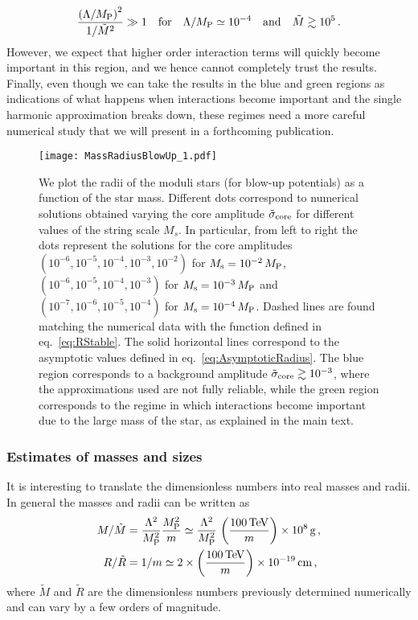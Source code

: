 \documentclass[11pt,a4paper]{article}
\begin{document}
\begin{equation}
\frac{\left(\Lambda/M_{\rm P}\right)^2}{1/\tilde{M}^2} \gg 1 \quad \text{for} \quad \Lambda/M_{\rm P} \simeq 10^{-4} \quad \text{and} \quad \tilde{M} \gtrsim 10^{5} \,.
\end{equation}
However, we expect that higher order interaction terms will quickly become important in this region, and we hence cannot completely trust the results. Finally, even though we can take the results in the blue and green regions as indications of what happens when interactions become important and the single harmonic approximation breaks down, these regimes need a more careful numerical study that we will present in a forthcoming publication.
\begin{figure}[h!]
\begin{center}
\texttt{[image: MassRadiusBlowUp\_1.pdf]}
\caption{We plot the radii of the moduli stars (for blow-up potentials) as a function of the star mass. Different dots correspond to numerical solutions obtained varying the core amplitude $\tilde{\sigma}_{\rm core}$ for different values of the string scale $M_s$. In particular, from left to right the dots represent the solutions for the core amplitudes $\left(10^{-6}, 10^{-5}, 10^{-4}, 10^{-3}, 10^{-2}\right)$ for $M_{\rm s} = 10^{-2} \, M_{\rm P}$, $\left(10^{-6}, 10^{-5}, 10^{-4}, 10^{-3}\right)$ for $M_{\rm s} = 10^{-3} \, M_{\rm P}$ and $\left(10^{-7}, 10^{-6}, 10^{-5}, 10^{-4}\right)$ for $M_{\rm s} = 10^{-4} \, M_{\rm P}$. Dashed lines are found matching the numerical data with the function defined in eq.~\eqref{eq:RStable}. The solid horizontal lines correspond to the asymptotic values defined in eq.~\eqref{eq:AsymptoticRadius}. The blue region corresponds to a background amplitude $\tilde{\sigma}_{\rm core} \gtrsim 10^{-3}$, where the approximations used are not fully reliable, while the green region corresponds to the regime in which interactions become important due to the large mass of the star, as explained in the main text. \label{fig:MassRadiusBlowUp}}
\end{center}
\end{figure}
\subsubsection{Estimates of masses and sizes}
It is interesting to translate the dimensionless numbers into real masses and radii. In general the masses and radii can be written as
\begin{align}
M/\tilde{M} & = \frac{\Lambda^2}{M_{\rm P}^2} \frac{M_{\rm P}^2}{m} \simeq \frac{\Lambda^2}{M_{\rm P}^2} \, \left(\frac{100 \, \text{TeV}}{m}\right) \times 10^8 \, \text{g} \,, \\
R/\tilde{R} & = 1/m \simeq 2 \times \left(\frac{100 \, \text{TeV}}{m}\right) \times 10^{-19} \, \text{cm} \,,
\end{align}
where $\tilde{M}$ and $\tilde{R}$ are the dimensionless numbers previously determined numerically and can vary by a few orders of magnitude.\\
\end{document}
